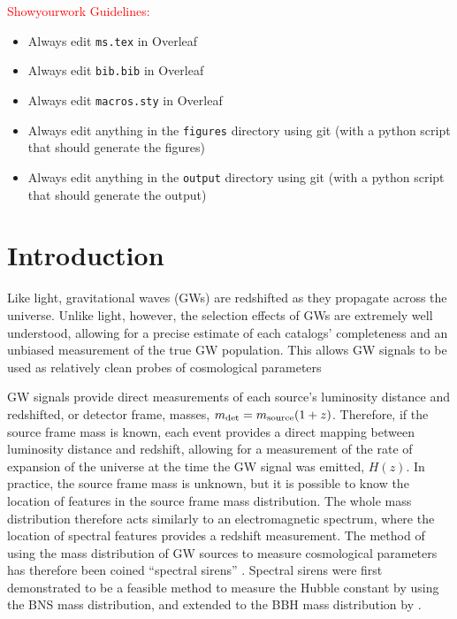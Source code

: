 \documentclass[]{aastex631}
\begin{document}
\section{}
\textcolor{red}{Showyourwork Guidelines:}
\begin{itemize}
    \item Always edit \texttt{ms.tex} in Overleaf
    \item Always edit \texttt{bib.bib} in Overleaf
    \item Always edit \texttt{macros.sty} in Overleaf
    \item Always edit anything in the \texttt{figures} directory using git (with a python script that should generate the figures)
    \item Always edit anything in the \texttt{output} directory using git (with a python script that should generate the output)
\end{itemize}

\section{Introduction}
\label{sec:intro}
Like light, gravitational waves (GWs) are redshifted as they propagate across the universe.
Unlike light, however, the selection effects of GWs are extremely well understood, allowing for a precise estimate of each catalogs' completeness and an unbiased measurement of the true GW population.
This allows GW signals to be used as relatively clean probes of cosmological parameters \citep[e.g.][]{}%

GW signals provide direct measurements of each source's luminosity distance and redshifted, or detector frame, masses, $m_{\det}= m_{\text{source}}(1+z)$.
Therefore, if the source frame mass is known, each event provides a direct mapping between luminosity distance and redshift, allowing for a measurement of the rate of expansion of the universe at the time the GW signal was emitted, $H(z)$.
In practice, the source frame mass is unknown, but it is possible to know the location of features in the source frame mass distribution.
The whole mass distribution therefore acts similarly to an electromagnetic spectrum, where the location of spectral features provides a redshift measurement.
The method of using the mass distribution of GW sources to measure cosmological parameters has therefore been coined ``spectral sirens'' \citep{ezquiaga_spectral_2022}.
Spectral sirens were first demonstrated to be a feasible method to measure the Hubble constant by \cite{chernoff+fin} using the BNS mass distribution, and extended to the BBH mass distribution by \cite{farr_future_2019}.
\end{document}
